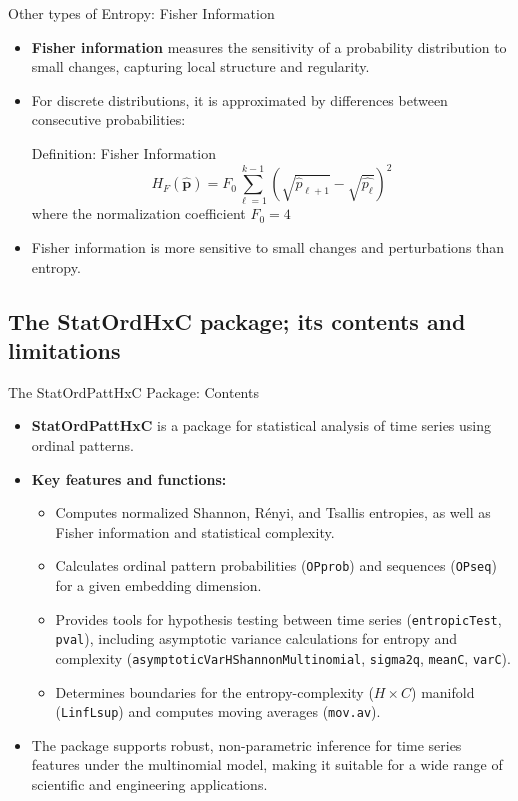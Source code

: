 \documentclass{beamer}
\begin{document}
\begin{frame}{Other types of Entropy: Fisher Information}
	\begin{itemize}
		\item \textbf{Fisher information} measures the sensitivity of a probability distribution to small changes, capturing local structure and regularity.
		\item For discrete distributions, it is approximated by differences between consecutive probabilities:
		\begin{block}{Definition: Fisher Information}
			\[
			H_F(\widehat{\mathbf{p}}) = F_0 \sum_{\ell=1}^{k-1} \left( \sqrt{{\widehat{p}_{\ell+1}}} - \sqrt{\widehat{p_\ell}} \right)^2
			\]
			where the normalization coefficient $F_0 = 4$
		\end{block}
		\item Fisher information is more sensitive to small changes and perturbations than entropy.
	\end{itemize}
\end{frame}



\subsection{The StatOrdHxC package; its contents and limitations}

\begin{frame}{The StatOrdPattHxC Package: Contents}
	\begin{itemize}
		\item \textbf{StatOrdPattHxC} is a package for statistical analysis of time series using ordinal patterns.
		\item \textbf{Key features and functions:}
		\begin{itemize}
			\item Computes normalized Shannon, Rényi, and Tsallis entropies, as well as Fisher information and statistical complexity.
			\item Calculates ordinal pattern probabilities (\texttt{OPprob}) and sequences (\texttt{OPseq}) for a given embedding dimension.
			\item Provides tools for hypothesis testing between time series (\texttt{entropicTest}, \texttt{pval}), including asymptotic variance calculations for entropy and complexity (\texttt{asymptoticVarHShannonMultinomial}, \texttt{sigma2q}, \texttt{meanC}, \texttt{varC}).
			\item Determines boundaries for the entropy-complexity ($H \times C$) manifold (\texttt{LinfLsup}) and computes moving averages (\texttt{mov.av}).
		\end{itemize}
		\item The package supports robust, non-parametric inference for time series features under the multinomial model, making it suitable for a wide range of scientific and engineering applications.
	\end{itemize}
\end{frame}
\end{document}
